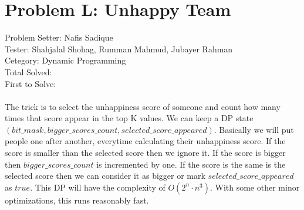 \section*{Problem L: Unhappy Team}
Problem Setter: Nafis Sadique \\
Tester: Shahjalal Shohag, Rumman Mahmud, Jubayer Rahman \\
Cetegory: Dynamic Programming \\
Total Solved:  \\
First to Solve: \\
\\ 
The trick is to select the unhappiness score of someone and count how many times that score appear
in the top K values. We can keep a DP state $(bit\_mask, bigger\_scores\_count, selected\_score\_appeared)$.
Basically we will put people one after another, everytime calculating their unhappiness score. If the 
score is smaller than the selected score then we ignore it. If the score is bigger then $bigger\_scores\_count$
is incremented by one. If the score is the same is the selected score then we can consider it as bigger or 
mark $selected\_score\_appeared$ as $true$. This DP will have the complexity of $O(2^n\cdot n^3)$. With some
other minor optimizations, this runs reasonably fast.